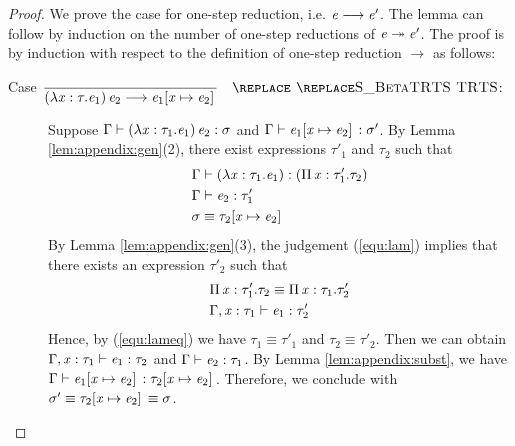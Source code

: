\begin{proof}
    We prove the case for one-step reduction, i.e. $\mathit{e}  \longrightarrow  \mathit{e'}$. The lemma
can follow by induction on the number of one-step reductions of $\mathit{e}  \twoheadrightarrow 
\mathit{e'}$.
    The proof is by induction with respect to the definition of one-step
reduction $ \longrightarrow $ as follows:
    \begin{description}
        \item[Case $\ottdruleSXXBeta{}$:] $\quad$ \\
        Suppose $\Gamma  \vdash  (  \lambda  \mathit{x}  :  \tau_{{\mathrm{1}}}  .  \mathit{e_{{\mathrm{1}}}}  ) \, \mathit{e_{{\mathrm{2}}}}  :  \sigma$ and $\Gamma  \vdash  \mathit{e_{{\mathrm{1}}}}  [  \mathit{x}  \mapsto  \mathit{e_{{\mathrm{2}}}}  ] \,  :  \sigma'$. By
Lemma \ref{lem:appendix:gen}(2), there exist expressions $\tau'_{{\mathrm{1}}}$ and $\tau_{{\mathrm{2}}}$
such that 
        \begin{align}
            &\Gamma  \vdash  (  \lambda  \mathit{x}  :  \tau_{{\mathrm{1}}}  .  \mathit{e_{{\mathrm{1}}}}  )  :  (  \Pi \, \mathit{x}  :  \tau'_{{\mathrm{1}}}  .  \tau_{{\mathrm{2}}}  ) \label{equ:lam} \\
            &\Gamma  \vdash  \mathit{e_{{\mathrm{2}}}}  :  \tau'_{{\mathrm{1}}} \nonumber \\
            &\sigma  \equiv  \tau_{{\mathrm{2}}}  [  \mathit{x}  \mapsto  \mathit{e_{{\mathrm{2}}}}  ] \, \nonumber
        \end{align}
        By Lemma \ref{lem:appendix:gen}(3), the judgement (\ref{equ:lam})
implies that there exists an expression $\tau'_{{\mathrm{2}}}$ such that
        \begin{align}
            &\Pi \, \mathit{x}  :  \tau'_{{\mathrm{1}}}  .  \tau_{{\mathrm{2}}}  \equiv  \Pi \, \mathit{x}  :  \tau_{{\mathrm{1}}}  .  \tau'_{{\mathrm{2}}} \label{equ:lameq}\\
            &\Gamma  ,  \mathit{x}  :  \tau_{{\mathrm{1}}}  \vdash  \mathit{e_{{\mathrm{1}}}}  :  \tau'_{{\mathrm{2}}} \nonumber
        \end{align}
        Hence, by (\ref{equ:lameq}) we have $\tau_{{\mathrm{1}}}  \equiv  \tau'_{{\mathrm{1}}}$ and $\tau_{{\mathrm{2}}}  \equiv  \tau'_{{\mathrm{2}}}$. Then we can obtain $\Gamma  ,  \mathit{x}  :  \tau_{{\mathrm{1}}}  \vdash  \mathit{e_{{\mathrm{1}}}}  :  \tau_{{\mathrm{2}}}$ and $\Gamma  \vdash  \mathit{e_{{\mathrm{2}}}}  :  \tau_{{\mathrm{1}}}$. By
Lemma \ref{lem:appendix:subst}, we have $\Gamma  \vdash  \mathit{e_{{\mathrm{1}}}}  [  \mathit{x}  \mapsto  \mathit{e_{{\mathrm{2}}}}  ] \,  :  \tau_{{\mathrm{2}}}  [  \mathit{x}  \mapsto  \mathit{e_{{\mathrm{2}}}}  ] \,$. Therefore, we conclude with $\sigma'  \equiv  \tau_{{\mathrm{2}}}  [  \mathit{x}  \mapsto  \mathit{e_{{\mathrm{2}}}}  ] \,  \equiv  \sigma$.
        

\end{description}
\end{proof}
